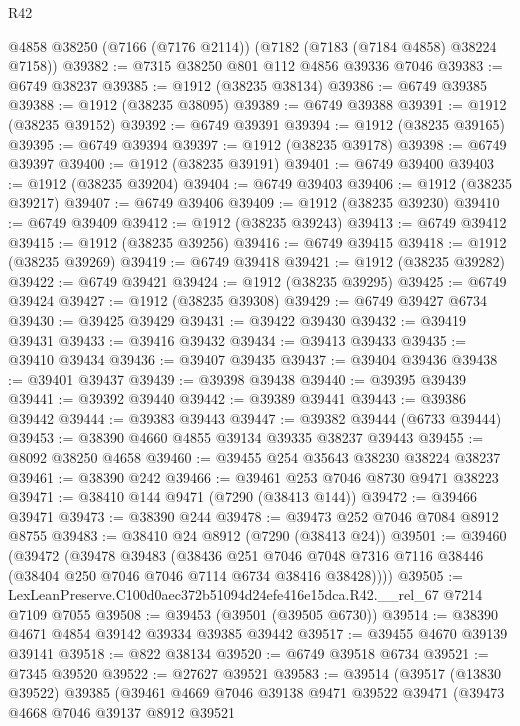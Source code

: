 \begin{lexlean}{R42}
\begin{coremodule}
{    @4858
    @38250
    (@7166 (@7176 @2114))
    (@7182 (@7183 (@7184 @4858) @38224 @7158))
@39382 := @7315 @38250 @801 @112 @4856 @39336 @7046
@39383 := @6749 @38237
@39385 := @1912 (@38235 @38134)
@39386 := @6749 @39385
@39388 := @1912 (@38235 @38095)
@39389 := @6749 @39388
@39391 := @1912 (@38235 @39152)
@39392 := @6749 @39391
@39394 := @1912 (@38235 @39165)
@39395 := @6749 @39394
@39397 := @1912 (@38235 @39178)
@39398 := @6749 @39397
@39400 := @1912 (@38235 @39191)
@39401 := @6749 @39400
@39403 := @1912 (@38235 @39204)
@39404 := @6749 @39403
@39406 := @1912 (@38235 @39217)
@39407 := @6749 @39406
@39409 := @1912 (@38235 @39230)
@39410 := @6749 @39409
@39412 := @1912 (@38235 @39243)
@39413 := @6749 @39412
@39415 := @1912 (@38235 @39256)
@39416 := @6749 @39415
@39418 := @1912 (@38235 @39269)
@39419 := @6749 @39418
@39421 := @1912 (@38235 @39282)
@39422 := @6749 @39421
@39424 := @1912 (@38235 @39295)
@39425 := @6749 @39424
@39427 := @1912 (@38235 @39308)
@39429 := @6749 @39427 @6734
@39430 := @39425 @39429
@39431 := @39422 @39430
@39432 := @39419 @39431
@39433 := @39416 @39432
@39434 := @39413 @39433
@39435 := @39410 @39434
@39436 := @39407 @39435
@39437 := @39404 @39436
@39438 := @39401 @39437
@39439 := @39398 @39438
@39440 := @39395 @39439
@39441 := @39392 @39440
@39442 := @39389 @39441
@39443 := @39386 @39442
@39444 := @39383 @39443
@39447 := @39382 @39444 (@6733 @39444)
@39453 := @38390 @4660 @4855 @39134 @39335 @38237 @39443
@39455 := @8092 @38250 @4658
@39460 := @39455 @254 @35643 @38230 @38224 @38237
@39461 := @38390 @242
@39466 := @39461 @253 @7046 @8730 @9471 @38223
@39471 := @38410 @144 @9471 (@7290 (@38413 @144))
@39472 := @39466 @39471
@39473 := @38390 @244
@39478 := @39473 @252 @7046 @7084 @8912 @8755
@39483 := @38410 @24 @8912 (@7290 (@38413 @24))
@39501 := @39460
    (@39472
      (@39478
        @39483
        (@38436
          @251
          @7046
          @7048
          @7316
          @7116
          @38446
          (@38404 @250 @7046 @7046 @7114 @6734 @38416 @38428))))
@39505 := LexLeanPreserve.C100d0aec372b51094d24efe416e15dca.R42.__rel_67 @7214 @7109 @7055
@39508 := @39453 (@39501 (@39505 @6730))
@39514 := @38390 @4671 @4854 @39142 @39334 @39385 @39442
@39517 := @39455 @4670 @39139 @39141
@39518 := @822 @38134
@39520 := @6749 @39518 @6734
@39521 := @7345 @39520
@39522 := @27627 @39521
@39583 := @39514
    (@39517
      (@13830 @39522)
      @39385
      (@39461
        @4669
        @7046
        @39138
        @9471
        @39522
        @39471
        (@39473
          @4668
          @7046
          @39137
          @8912
          @39521
}
\end{coremodule}
\end{lexlean}
